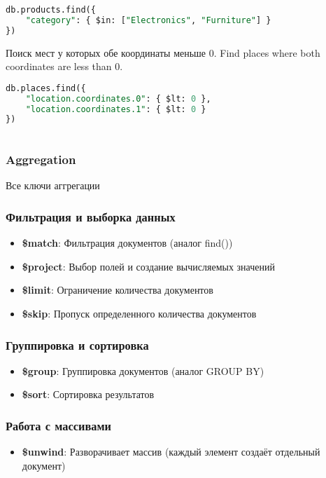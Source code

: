 \documentclass[a4paper,12pt]{article}
\begin{document}
\begin{lstlisting}[language=SQL]
db.products.find({
    "category": { $in: ["Electronics", "Furniture"] }
})
\end{lstlisting}

Поиск мест у которых обе координаты меньше 0.
\newline
Find places where both coordinates are less than 0.
\begin{lstlisting}[language=SQL]
db.places.find({
    "location.coordinates.0": { $lt: 0 },
    "location.coordinates.1": { $lt: 0 }
})
      
\end{lstlisting}

\subsubsection{Aggregation}
Все ключи аггрегации


\subsubsection{Фильтрация и выборка данных}
\begin{itemize}[noitemsep]
    \item \textbf{\$match}: Фильтрация документов (аналог find())
    \item \textbf{\$project}: Выбор полей и создание вычисляемых значений
    \item \textbf{\$limit}: Ограничение количества документов
    \item \textbf{\$skip}: Пропуск определенного количества документов
\end{itemize}

\subsubsection{Группировка и сортировка}
\begin{itemize}[noitemsep]
    \item \textbf{\$group}: Группировка документов (аналог GROUP BY)
    \item \textbf{\$sort}: Сортировка результатов
\end{itemize}

\subsubsection{Работа с массивами}
\begin{itemize}[noitemsep]
    \item \textbf{\$unwind}: Разворачивает массив (каждый элемент создаёт отдельный документ)
\end{itemize}
\end{document}

